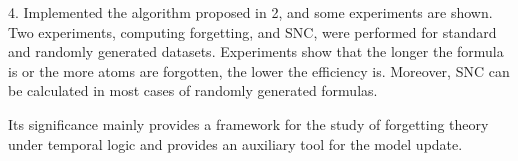 \begin{englishabstract}
4. Implemented the algorithm proposed in 2, and some experiments are shown. Two experiments, computing forgetting, and SNC, were performed for standard and randomly generated datasets. Experiments show that the longer the formula is or the more atoms are forgotten, the lower the efficiency is. Moreover, SNC can be calculated in most cases of randomly generated formulas.

Its significance mainly provides a framework for the study of forgetting theory under temporal logic and provides an auxiliary tool for the model update.




	
%	
%
%

\end{englishabstract}
